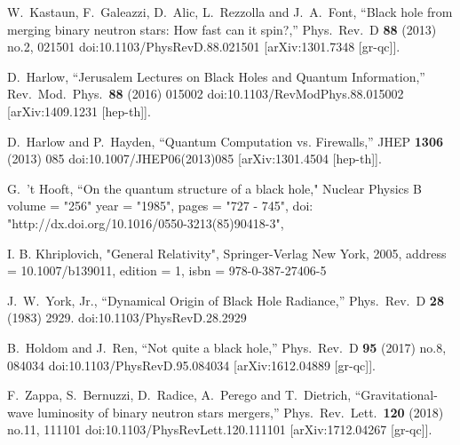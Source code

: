 \documentclass[12pt]{article}
\begin{document}
\begin{thebibliography}{99}
  W.~Kastaun, F.~Galeazzi, D.~Alic, L.~Rezzolla and J.~A.~Font,
  ``Black hole from merging binary neutron stars: How fast can it spin?,''
  Phys.\ Rev.\ D {\bf 88} (2013) no.2,  021501
  doi:10.1103/PhysRevD.88.021501
  [arXiv:1301.7348 [gr-qc]].
  
  D.~Harlow,
  ``Jerusalem Lectures on Black Holes and Quantum Information,''
  Rev.\ Mod.\ Phys.\  {\bf 88} (2016) 015002
  doi:10.1103/RevModPhys.88.015002
  [arXiv:1409.1231 [hep-th]].
  
  D.~Harlow and P.~Hayden,
  ``Quantum Computation vs. Firewalls,''
  JHEP {\bf 1306} (2013) 085
  doi:10.1007/JHEP06(2013)085
  [arXiv:1301.4504 [hep-th]].

  G.~'t Hooft,
  ``On the quantum structure of a black hole,"
  Nuclear Physics B
  volume = "256"
  year = "1985",
  pages = "727 - 745",
  doi: "http://dx.doi.org/10.1016/0550-3213(85)90418-3",

  I. B. Khriplovich, 
  "General Relativity",
  Springer-Verlag New York,
  2005,
  address   = {10.1007/b139011},
  edition   = 1,
  isbn      = {978-0-387-27406-5}

  J.~W.~York, Jr.,
  ``Dynamical Origin of Black Hole Radiance,''
  Phys.\ Rev.\ D {\bf 28} (1983) 2929.
  doi:10.1103/PhysRevD.28.2929

  B.~Holdom and J.~Ren,
  ``Not quite a black hole,''
  Phys.\ Rev.\ D {\bf 95} (2017) no.8,  084034
  doi:10.1103/PhysRevD.95.084034
  [arXiv:1612.04889 [gr-qc]].
  
  F.~Zappa, S.~Bernuzzi, D.~Radice, A.~Perego and T.~Dietrich,
  ``Gravitational-wave luminosity of binary neutron stars mergers,''
  Phys.\ Rev.\ Lett.\  {\bf 120} (2018) no.11,  111101
  doi:10.1103/PhysRevLett.120.111101
  [arXiv:1712.04267 [gr-qc]].


\end{thebibliography}
\end{document}
